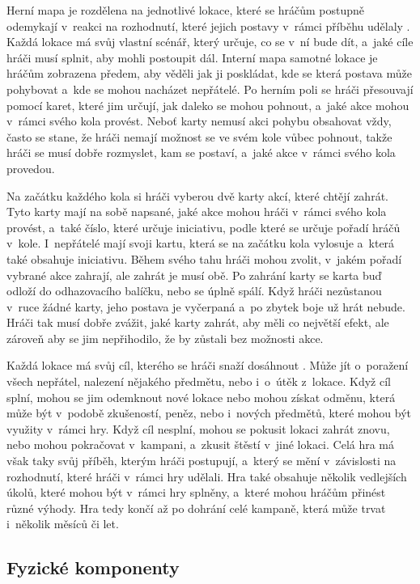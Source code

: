 Herní mapa je rozdělena na jednotlivé lokace, které se hráčům postupně odemykají v~reakci na rozhodnutí, které jejich postavy v~rámci příběhu udělaly . Každá lokace má svůj vlastní scénář, který určuje, co se v~ní bude dít, a~jaké cíle hráči musí splnit, aby mohli postoupit dál. Interní mapa samotné lokace je hráčům zobrazena předem, aby věděli jak ji poskládat, kde se která postava může pohybovat a~kde se mohou nacházet nepřátelé. Po herním poli se hráči přesouvají pomocí karet, které jim určují, jak daleko se mohou pohnout, a~jaké akce mohou v~rámci svého kola provést. Neboť karty nemusí akci pohybu obsahovat vždy, často se stane, že hráči nemají možnost se ve svém kole vůbec pohnout, takže hráči se musí dobře rozmyslet, kam se postaví, a~jaké akce v~rámci svého kola provedou.

Na začátku každého kola si hráči vyberou dvě karty akcí, které chtějí zahrát. Tyto karty mají na sobě napsané, jaké akce mohou hráči v~rámci svého kola provést, a~také číslo, které určuje iniciativu, podle které se určuje pořadí hráčů v~kole. I~nepřátelé mají svoji kartu, která se na začátku kola vylosuje a~která také obsahuje iniciativu. Během svého tahu hráči mohou zvolit, v~jakém pořadí vybrané akce zahrají, ale zahrát je musí obě. Po zahrání karty se karta buď odloží do odhazovacího balíčku, nebo se úplně spálí. Když hráči nezůstanou v~ruce žádné karty, jeho postava je vyčerpaná a~po zbytek boje už hrát nebude. Hráči tak musí dobře zvážit, jaké karty zahrát, aby měli co největší efekt, ale zároveň aby se jim nepřihodilo, že by zůstali bez možnosti akce.

Každá lokace má svůj cíl, kterého se hráči snaží dosáhnout . Může jít o~poražení všech nepřátel, nalezení nějakého předmětu, nebo i~o~útěk z~lokace. Když cíl splní, mohou se jim odemknout nové lokace nebo mohou získat odměnu, která může být v~podobě zkušeností, peněz, nebo i~nových předmětů, které mohou být využity v~rámci hry. Když cíl nesplní, mohou se pokusit lokaci zahrát znovu, nebo mohou pokračovat v~kampani, a~zkusit štěstí v~jiné lokaci. Celá hra má však taky svůj příběh, kterým hráči postupují, a~který se mění v~závislosti na rozhodnutí, které hráči v~rámci hry udělali. Hra také obsahuje několik vedlejších úkolů, které mohou být v~rámci hry splněny, a~které mohou hráčům přinést různé výhody. Hra tedy končí až po dohrání celé kampaně, která může trvat i~několik měsíců či let.

\subsection{Fyzické komponenty}
\label{subsec:gh_components}

